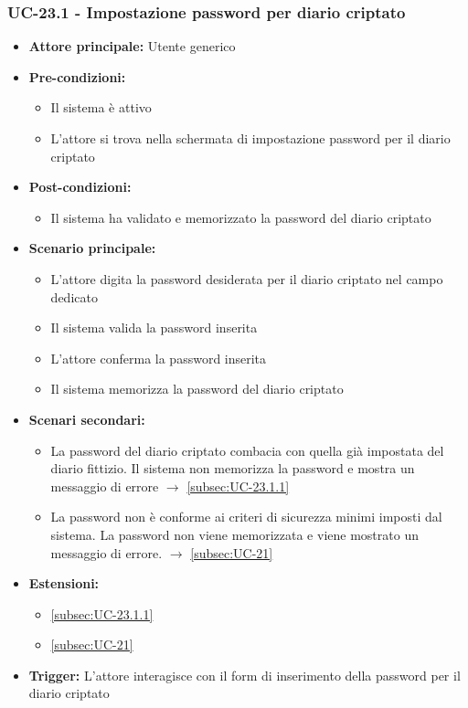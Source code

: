 \documentclass[a4paper,12pt]{article}
\begin{document}
\subsubsection{UC-23.1 - Impostazione password per diario criptato} \label{subsec:UC-23.1}
\begin{itemize}
    \item \textbf{Attore principale:} Utente generico
    \item \textbf{Pre-condizioni:}
    \begin{itemize}
        \item Il sistema è attivo
        \item L'attore si trova nella schermata di impostazione password per il diario criptato
    \end{itemize}
    \item \textbf{Post-condizioni:} 
    \begin{itemize}
        \item Il sistema ha validato e memorizzato la password del diario criptato
    \end{itemize}
    \item \textbf{Scenario principale:} 
    \begin{itemize}
        \item L'attore digita la password desiderata per il diario criptato nel campo dedicato
        \item Il sistema valida la password inserita
        \item L'attore conferma la password inserita
        \item Il sistema memorizza la password del diario criptato
    \end{itemize}
    \item \textbf{Scenari secondari:} 
    \begin{itemize}
        \item La password del diario criptato combacia con quella già impostata del diario fittizio. Il sistema non memorizza la password e mostra un messaggio di errore $\rightarrow$ \ref{subsec:UC-23.1.1}
        \item La password non è conforme ai criteri di sicurezza minimi imposti dal sistema. La password non viene memorizzata e viene mostrato un messaggio di errore. $\rightarrow$ \ref{subsec:UC-21}
    \end{itemize}
    \item \textbf{Estensioni:}
    \begin{itemize}
        \item \ref{subsec:UC-23.1.1}
        \item \ref{subsec:UC-21}
    \end{itemize}
    \item \textbf{Trigger:} L'attore interagisce con il form di inserimento della password per il diario criptato
\end{itemize}
\end{document}

